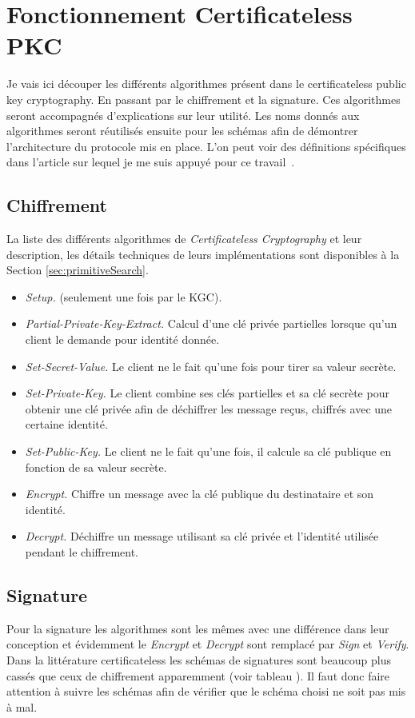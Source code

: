 \section{Fonctionnement Certificateless PKC}
Je vais ici découper les différents algorithmes présent dans le certificateless public key cryptography. En passant par le chiffrement et la signature.
Ces algorithmes seront accompagnés d'explications sur leur utilité. Les noms donnés aux algorithmes seront réutilisés ensuite pour les schémas afin de démontrer l'architecture du protocole mis en place. L'on peut voir des définitions spécifiques dans l'article sur lequel je me suis appuyé pour ce travail~\cite{DBLP:conf/pkc/DentLP08}.
\subsection{Chiffrement}
La liste des différents algorithmes de \textit{Certificateless Cryptography} et leur description, les détails techniques de leurs implémentations sont disponibles à la Section \ref{sec:primitiveSearch}.
\begin{itemize}
	\item \textit{Setup.} (seulement une fois par le KGC).
	\item \textit{Partial-Private-Key-Extract.} Calcul d'une clé privée partielles lorsque qu'un client le demande pour identité donnée.
	\item \textit{Set-Secret-Value.} Le client ne le fait qu'une fois pour tirer sa valeur secrète.
	\item \textit{Set-Private-Key.} Le client combine ses clés partielles et sa clé secrète pour obtenir une clé privée afin de déchiffrer les message reçus, chiffrés avec une certaine identité.
	\item \textit{Set-Public-Key.} Le client ne le fait qu'une fois, il calcule sa clé publique en fonction de sa valeur secrète.
	\item \textit{Encrypt.} Chiffre un message avec la clé publique du destinataire et son identité.
	\item \textit{Decrypt.} Déchiffre un message utilisant sa clé privée et l'identité utilisée pendant le chiffrement.
\end{itemize}
\subsection{Signature}
Pour la signature les algorithmes sont les mêmes avec une différence dans leur conception et évidemment le \textit{Encrypt} et \textit{Decrypt} sont remplacé par \textit{Sign} et \textit{Verify}.
Dans la littérature certificateless les schémas de signatures sont beaucoup plus cassés que ceux de chiffrement apparemment (voir tableau ). Il faut donc faire attention à suivre les schémas afin de vérifier que le schéma choisi ne soit pas mis à mal.
